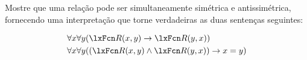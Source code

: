 \problempart
Mostre que uma relação pode ser simultaneamente simétrica e antissimétrica, fornecendo uma interpretação que torne verdadeiras as duas sentenças seguintes:


\begin{align*}
	& \forall x\forall y(\atom{R}{x,y} \eif \atom{R}{y,x})\\
	& \forall x\forall y((\atom{R}{x,y} \eand \atom{R}{y,x}) \eif x=y)
\end{align*}
